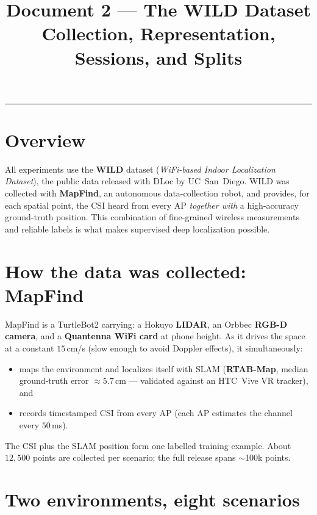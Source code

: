 \documentclass[11pt,a4paper]{article}
\title{\vspace{-1.5em}\textbf{Document 2 --- The WILD Dataset}\\
\large Collection, Representation, Sessions, and Splits}
\author{}
\date{}
\begin{document}
\maketitle
\tableofcontents
\vspace{1em}\hrule\vspace{1em}

\section{Overview}

All experiments use the \textbf{WILD} dataset (\emph{WiFi-based Indoor Localization Dataset}),
the public data released with DLoc by UC~San~Diego. WILD was collected with \textbf{MapFind}, an
autonomous data-collection robot, and provides, for each spatial point, the CSI heard from every
AP \emph{together with} a high-accuracy ground-truth position. This combination of fine-grained
wireless measurements and reliable labels is what makes supervised deep localization possible.

\section{How the data was collected: MapFind}

MapFind is a TurtleBot2 carrying: a Hokuyo \textbf{LIDAR}, an Orbbec \textbf{RGB-D camera}, and a
\textbf{Quantenna WiFi card} at phone height. As it drives the space at a constant
$15$\,cm/s (slow enough to avoid Doppler effects), it simultaneously:
\begin{itemize}[nosep]
  \item maps the environment and localizes itself with SLAM (\textbf{RTAB-Map}, median ground-truth
  error $\approx 5.7$\,cm --- validated against an HTC~Vive VR tracker), and
  \item records timestamped CSI from every AP (each AP estimates the channel every $50$\,ms).
\end{itemize}
The CSI plus the SLAM position form one labelled training example. About $12{,}500$ points are
collected per scenario; the full release spans $\sim$100k points.

\section{Two environments, eight scenarios}
\end{document}
